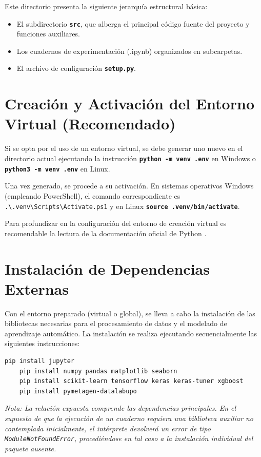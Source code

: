 Este directorio presenta la siguiente jerarquía estructural básica:
\begin{itemize}
	\item El subdirectorio \textbf{\texttt{src}}, que alberga el principal código fuente del proyecto y funciones auxiliares.
	\item Los cuadernos de experimentación (.ipynb) organizados en subcarpetas.
	\item El archivo de configuración \textbf{\texttt{setup.py}}.
\end{itemize}

\section*{Creación y Activación del Entorno Virtual (Recomendado)}
Si se opta por el uso de un entorno virtual, se debe generar uno nuevo en el directorio actual ejecutando la instrucción \textbf{\texttt{python -m venv .env}} en Windows o \textbf{\texttt{python3 -m venv .env}} en Linux. 

Una vez generado, se procede a su activación. En sistemas operativos Windows (empleando PowerShell), el comando correspondiente es \texttt{.\textbackslash.venv\textbackslash Scripts\textbackslash Activate.ps1} y en Linux \textbf{\texttt{source .venv/bin/activate}}.

Para profundizar en la configuración del entorno de creación virtual es recomendable la lectura de la documentación oficial de Python \cite{creacion-venv}.

\section*{Instalación de Dependencias Externas}
Con el entorno preparado (virtual o global), se lleva a cabo la instalación de las bibliotecas necesarias para el procesamiento de datos y el modelado de aprendizaje automático. La instalación se realiza ejecutando secuencialmente las siguientes instrucciones:
\begin{lstlisting}[language=bash, caption={Comandos de instalación de librerías externas}, label={cod:instalacion_librerias}, captionpos=b]
	pip install jupyter
	pip install numpy pandas matplotlib seaborn
	pip install scikit-learn tensorflow keras keras-tuner xgboost
	pip install pymetagen-datalabupo
\end{lstlisting}

\textit{Nota: La relación expuesta comprende las dependencias principales. En el supuesto de que la ejecución de un cuaderno requiera una biblioteca auxiliar no contemplada inicialmente, el intérprete devolverá un error de tipo \texttt{ModuleNotFoundError}, procediéndose en tal caso a la instalación individual del paquete ausente.}


